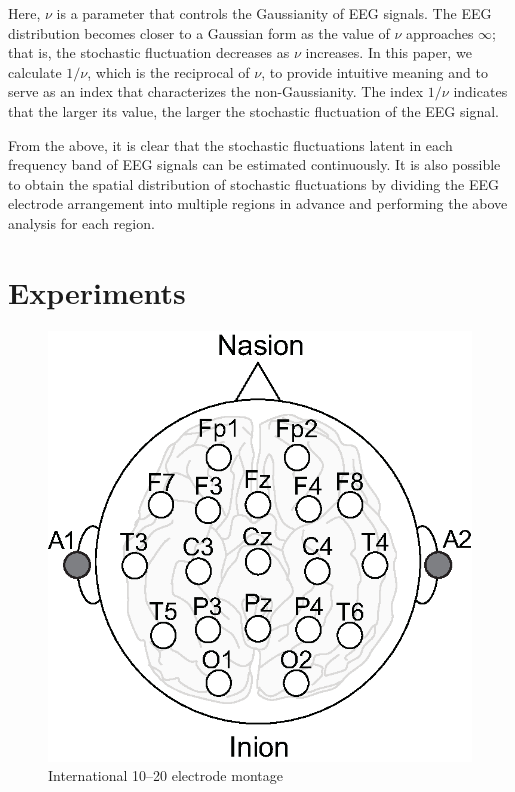 \documentclass[journal]{IEEEtran}
\begin{document}
Here, $\nu$ is a parameter that controls the Gaussianity of EEG signals.
The EEG distribution becomes closer to a Gaussian form as the value of $\nu$ approaches $\infty$; that is, the stochastic fluctuation decreases as $\nu$ increases.
In this paper, we calculate $1/\nu$, which is the reciprocal of $\nu$, to provide intuitive meaning and to serve as an index that characterizes the non-Gaussianity. 
The index $1/\nu$ indicates that the larger its value, the larger the stochastic fluctuation of the EEG signal.

From the above, it is clear that the stochastic fluctuations latent in each frequency band of EEG signals can be estimated continuously.
It is also possible to obtain the spatial distribution of stochastic fluctuations by dividing the EEG electrode arrangement into multiple regions in advance and performing the above analysis for each region.


\section{Experiments}
\begin{figure}[!t]
\centering
\includegraphics[width=0.5\hsize]{figure/electrodes.eps}
\caption{International 10--20 electrode montage}
\label{fig:electrodes}
\end{figure}
\end{document}
